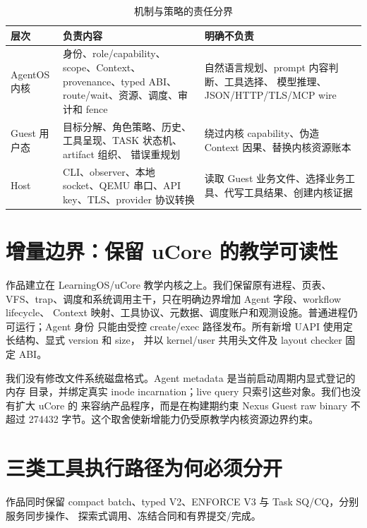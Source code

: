 \begin{table}[htbp]
\centering
\caption{机制与策略的责任分界}
\label{tab:kernel-user-boundary}
\begin{tabularx}{\textwidth}{L{2.5cm}YY}
\toprule
\textbf{层次} & \textbf{负责内容} & \textbf{明确不负责} \\
\midrule
AgentOS 内核 & 身份、role/capability、scope、Context、provenance、typed ABI、
route/wait、资源、调度、审计和 fence & 自然语言规划、prompt 内容判断、工具选择、
模型推理、JSON/HTTP/TLS/MCP wire \\
Guest 用户态 & 目标分解、角色策略、历史、工具呈现、TASK 状态机、artifact 组织、
错误重规划 & 绕过内核 capability、伪造 Context 因果、替换内核资源账本 \\
Host & CLI、observer、本地 socket、QEMU 串口、API key、TLS、provider 协议转换 &
读取 Guest 业务文件、选择业务工具、代写工具结果、创建内核证据 \\
\bottomrule
\end{tabularx}
\end{table}

\section{增量边界：保留 uCore 的教学可读性}

作品建立在 LearningOS/uCore 教学内核之上\cite{ucore2025}。我们保留原有进程、页表、
VFS、trap、调度和系统调用主干，只在明确边界增加 Agent 字段、workflow lifecycle、
Context 映射、工具协议、元数据、调度账户和观测设施。普通进程仍可运行；Agent 身份
只能由受控 create/exec 路径发布。所有新增 UAPI 使用定长结构、显式 version 和 size，
并以 kernel/user 共用头文件及 layout checker 固定 ABI。

我们没有修改文件系统磁盘格式。Agent metadata 是当前启动周期内显式登记的内存
目录，并绑定真实 inode incarnation；live query 只索引这些对象。我们也没有扩大
uCore 的  来容纳产品程序，而是在构建期约束 Nexus Guest raw binary
不超过 274432 字节。这个取舍使新增能力仍受原教学内核资源边界约束。

\section{三类工具执行路径为何必须分开}

作品同时保留 compact batch、typed V2、ENFORCE V3 与 Task SQ/CQ，分别服务同步操作、
探索式调用、冻结合同和有界提交/完成。

